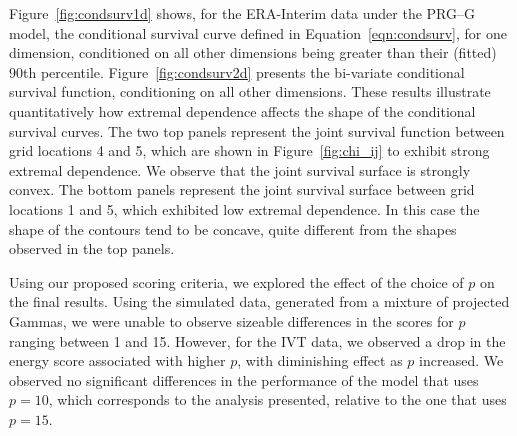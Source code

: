 Figure~\ref{fig:condsurv1d} shows, for the ERA-Interim data under the PRG--G model,  
    the conditional survival curve defined in Equation~\ref{eqn:condsurv}, for one dimension, 
    conditioned on all other dimensions being greater than their (fitted) $90$th percentile. 
    Figure~\ref{fig:condsurv2d} presents the bi-variate conditional survival function,
    conditioning on all other dimensions.  These results illustrate quantitatively how 
    extremal dependence affects the shape of the conditional survival curves.  The two 
    top panels represent the joint survival function 
    between grid locations 4 and 5, which are shown in Figure~\ref{fig:chi_ij} to exhibit 
    strong  extremal dependence.  We observe that the joint survival surface 
    is strongly convex.  The bottom panels represent the joint survival surface between 
    grid locations 1 and 5, which exhibited low extremal dependence.  In this case the 
    shape of the contours tend to be concave, quite different from the shapes observed 
    in the top panels.

Using our proposed scoring criteria, we explored the effect of the choice of $p$ on the 
    final results. Using the simulated data, generated from a mixture of projected Gammas, 
    we were unable to observe sizeable differences in the scores for $p$ ranging between 
    1 and 15.   However, for the IVT data, we observed a drop in the energy score associated 
    with higher $p$, with diminishing effect as $p$ increased.  We observed no significant 
    differences in the performance of the model that uses $p=10$, which corresponds to the 
    analysis presented, relative to the one that uses $p=15$.
